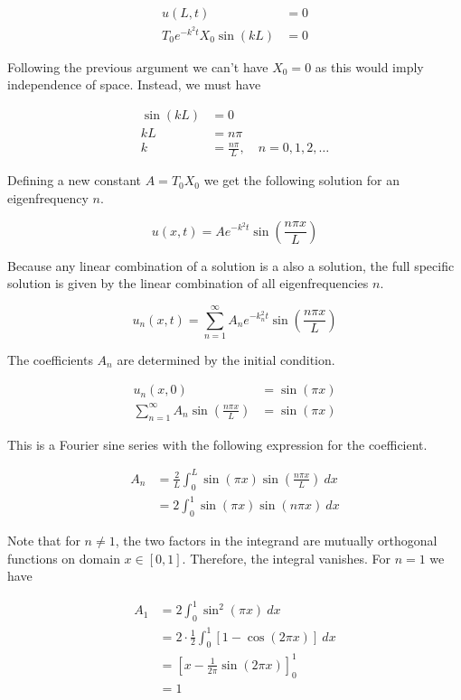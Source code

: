 \documentclass[12pt]{extarticle}
\begin{document}
\begin{align*}
	u(L,t) &= 0 \\
	T_0 e^{-k^2 t} X_0 \sin(kL) &= 0
\end{align*}

Following the previous argument we can't have $X_0=0$ as this would imply independence of space. Instead, we must have 

\begin{align*}
	\sin(kL) &= 0 \\
	kL &= n\pi \\
	k &= \frac{n\pi}{L}, \quad n=0,1,2,\dots
\end{align*}

Defining a new constant $A=T_0 X_0$ we get the following solution for an eigenfrequency $n$.

\[ u(x,t) = A e^{-k^2t} \sin(\frac{n\pi x}{L}) \]

Because any linear combination of a solution is a also a solution, the full specific solution is given by the linear combination of all eigenfrequencies $n$.

\[ u_n(x,t) = \sum_{n=1}^{\infty} A_n e^{-k_n^2 t} \sin(\frac{n\pi x}{L}) \]

The coefficients $A_n$ are determined by the initial condition.

\begin{align*}
	u_n(x,0) &= \sin(\pi x) \\
	\sum_{n=1}^{\infty} A_n \sin(\frac{n\pi x}{L}) &= \sin(\pi x) 
\end{align*}

This is a Fourier sine series with the following expression for the coefficient.

\begin{align*}
	A_n &= \frac{2}{L} \int_0^L \sin(\pi x)\sin(\frac{n\pi x}{L})\:dx \\
	&= 2 \int_0^1 \sin(\pi x)\sin(n\pi x)\:dx
\end{align*}

Note that for $n \ne 1$, the two factors in the integrand are mutually orthogonal functions on domain $x \in [0,1]$. Therefore, the integral vanishes. For $n=1$ we have

\begin{align*}
	A_1 &= 2 \int_0^1 \sin^2(\pi x)\:dx \\
	&= 2\cdot \frac{1}{2} \int_0^1 [1 - \cos(2\pi x)]\:dx \\
	&= [x - \frac{1}{2\pi}\sin(2\pi x)]_0^1 \\
	&= 1
\end{align*}
\end{document}
